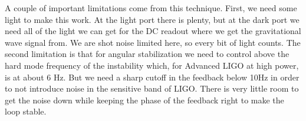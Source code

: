 A couple of important limitations come from this technique. First, we need some
light to make this work. At the light port there is plenty, but at the dark
port we need all of the light we can get for the DC readout where we get the
gravitational wave signal from.
We are shot noise limited here, so every bit of light counts.
The second limitation is that for angular stabilization
we need to control above the hard mode frequency of the instability which,
for Advanced LIGO at high power, is at about 6 Hz.
But we need a sharp cutoff in the feedback below 10Hz in order to not introduce
noise in the sensitive band of LIGO.
There is very little room to get the noise down while keeping the phase of the
feedback right to make the loop stable.



